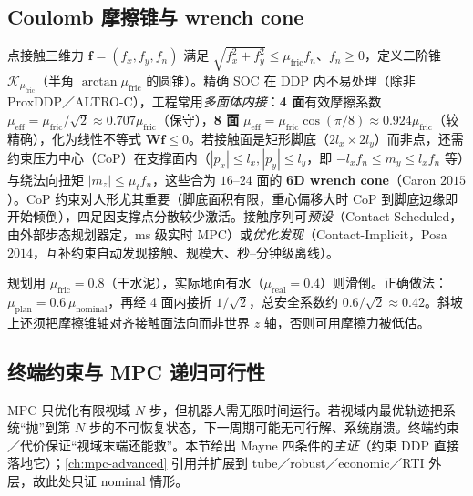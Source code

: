 \subsection{Coulomb 摩擦锥与 wrench cone}
\label{sec:ddp-friction}

点接触三维力 $\mathbf{f}=(f_x,f_y,f_n)$ 满足 $\sqrt{f_x^2+f_y^2}\le\mu_{\mathrm{fric}}f_n$、$f_n\ge0$，定义二阶锥 $\mathcal{K}_{\mu_{\mathrm{fric}}}$（半角 $\arctan\mu_{\mathrm{fric}}$ 的圆锥）。精确 SOC 在 DDP 内不易处理（除非 ProxDDP／ALTRO-C），工程常用\emph{多面体内接}：\textbf{4 面}有效摩擦系数 $\mu_{\mathrm{eff}}=\mu_{\mathrm{fric}}/\sqrt2\approx0.707\mu_{\mathrm{fric}}$（保守），\textbf{8 面} $\mu_{\mathrm{eff}}=\mu_{\mathrm{fric}}\cos(\pi/8)\approx0.924\mu_{\mathrm{fric}}$（较精确），化为线性不等式 $\mathbf{W}\mathbf{f}\le0$。若接触面是矩形脚底（$2l_x\times2l_y$）而非点，还需约束压力中心（CoP）在支撑面内（$|p_x|\le l_x,|p_y|\le l_y$，即 $-l_x f_n\le m_y\le l_x f_n$ 等）与绕法向扭矩 $|m_z|\le\mu_t f_n$，这些合为 $16$--$24$ 面的 \textbf{6D wrench cone}（Caron $2015$\cite{caron2015wrench}）。CoP 约束对人形尤其重要（脚底面积有限，重心偏移大时 CoP 到脚底边缘即开始倾倒），四足因支撑点分散较少激活。接触序列可\emph{预设}（Contact-Scheduled，由外部步态规划器定，ms 级实时 MPC）或\emph{优化发现}（Contact-Implicit，Posa $2014$\cite{posa2014contact}，互补约束自动发现接触、规模大、秒--分钟级离线）。

\begin{pitfall}[摩擦系数不保守化]
规划用 $\mu_{\mathrm{fric}}=0.8$（干水泥），实际地面有水（$\mu_{\mathrm{real}}=0.4$）则滑倒。正确做法：$\mu_{\mathrm{plan}}=0.6\,\mu_{\mathrm{nominal}}$，再经 4 面内接折 $1/\sqrt2$，总安全系数约 $0.6/\sqrt2\approx0.42$。斜坡上还须把摩擦锥轴对齐接触面法向而非世界 $z$ 轴，否则可用摩擦力被低估。
\end{pitfall}

\subsection{终端约束与 MPC 递归可行性}
\label{sec:ddp-terminal}

MPC 只优化有限视域 $N$ 步，但机器人需无限时间运行。若视域内最优轨迹把系统“抛”到第 $N$ 步的不可恢复状态，下一周期可能无可行解、系统崩溃。终端约束／代价保证“视域末端还能救”。本节给出 Mayne 四条件的\emph{主证}（约束 DDP 直接落地它）；\cref{ch:mpc-advanced} 引用并扩展到 tube／robust／economic／RTI 外层，故此处只证 nominal 情形。

